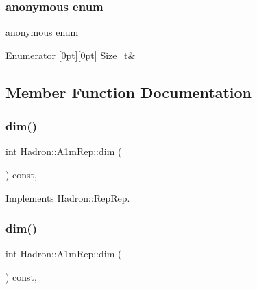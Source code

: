 \subsubsection{\texorpdfstring{anonymous enum}{anonymous enum}}
{\footnotesize\ttfamily anonymous enum}

\begin{DoxyEnumFields}{Enumerator}
[0pt][0pt]{}\mbox{\label{structHadron_1_1A1mRep_a1b3b08bf5630d62ce6cc6e35ce30146fa36c9812a16421080e6dfdf2635eaa804}} 
Size\+\_\+t&\\
\hline

\end{DoxyEnumFields}


\subsection{Member Function Documentation}
\mbox{\label{structHadron_1_1A1mRep_a475332da370a6a8c6ad3d24cf3f6d38a}} 
\subsubsection{\texorpdfstring{dim()}{dim()}\hspace{0.1cm}{\footnotesize\ttfamily [1/5]}}
{\footnotesize\ttfamily int Hadron\+::\+A1m\+Rep\+::dim (\begin{DoxyParamCaption}{ }\end{DoxyParamCaption}) const\hspace{0.3cm}{\ttfamily [inline]}, {\ttfamily [virtual]}}



Implements \mbox{\hyperlink{structHadron_1_1RepRep_a92c8802e5ed7afd7da43ccfd5b7cd92b}{Hadron\+::\+Rep\+Rep}}.

\mbox{\label{structHadron_1_1A1mRep_a475332da370a6a8c6ad3d24cf3f6d38a}} 
\subsubsection{\texorpdfstring{dim()}{dim()}\hspace{0.1cm}{\footnotesize\ttfamily [2/5]}}
{\footnotesize\ttfamily int Hadron\+::\+A1m\+Rep\+::dim (\begin{DoxyParamCaption}{ }\end{DoxyParamCaption}) const\hspace{0.3cm}{\ttfamily [inline]}, {\ttfamily [virtual]}}



